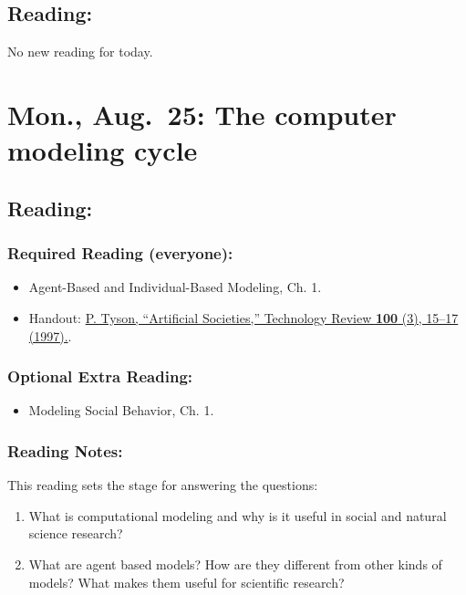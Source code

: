 \documentclass[
]{article}
\providecommand{\tightlist}{%
  \setlength{\itemsep}{0pt}\setlength{\parskip}{0pt}}
\begin{document}
\subsection{Reading:}\label{reading}

No new reading for today.

\section{Mon., Aug.~25: The computer modeling
cycle}\label{mon.-aug.-25-the-computer-modeling-cycle}

\subsection{Reading:}\label{reading-1}

\subsubsection{Required Reading
(everyone):}\label{required-reading-everyone}

\begin{itemize}
\tightlist
\item
  Agent-Based and Individual-Based Modeling, Ch. 1.
\item
  Handout: \href{/files/reading/Tyson_Artificial_Societies_1997.pdf}{P.
  Tyson, ``Artificial Societies,'' Technology Review \textbf{100} (3),
  15--17 (1997).}.
\end{itemize}

\subsubsection{Optional Extra Reading:}\label{optional-extra-reading}

\begin{itemize}
\tightlist
\item
  Modeling Social Behavior, Ch. 1.
\end{itemize}

\subsubsection{Reading Notes:}\label{reading-notes}

This reading sets the stage for answering the questions:

\begin{enumerate}
\def\labelenumi{\arabic{enumi}.}
\tightlist
\item
  What is computational modeling and why is it useful in social and
  natural science research?
\item
  What are agent based models? How are they different from other kinds
  of models? What makes them useful for scientific research?
\end{enumerate}
\end{document}
